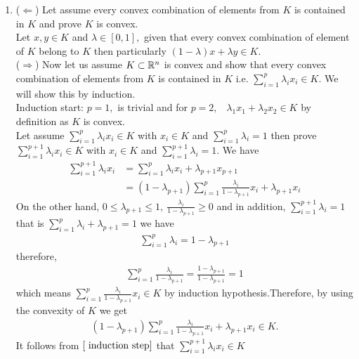 \documentclass{ExerciseSheet}
\begin{document}
\begin{solution}
\begin{enumerate}
    \item ($\Leftarrow$) Let assume every convex combination of elements from $K$ is contained in $K$ and prove $K$ is convex.\\
    Let $x,y\in K$ and $\lambda\in [0, 1],$ given that every convex combination of element of $K$ belong to $K$ then particularly $(1-\lambda)x+\lambda y\in K.$\\
    ($\Rightarrow$) Now let us assume $K\subset \mathbb{R}^n$ is convex and show that every convex combination of elements from $K$ is contained in $K$ i.e. $\displaystyle \sum_{i=1}^{p}\lambda_ix_i\in K.$ We will show this by induction.\\
    Induction start:  $p=1,$ is trivial and for $p=2,$~ $\lambda_1x_1+\lambda_2x_2\in K$ by definition as $K$ is convex.\\
    Let assume $\displaystyle \sum_{i=1}^{p}\lambda_ix_i\in K$ with $x_i\in K$ and $\displaystyle \sum_{i=1}^{p}\lambda_i=1$ then prove $\displaystyle \sum_{i=1}^{p+1}\lambda_ix_i\in K$ with $x_i\in K$ and $\displaystyle \sum_{i=1}^{p+1}\lambda_i=1.$
    We have
      \begin{align}
          \sum_{i=1}^{p+1}\lambda_ix_i&= \sum_{i=1}^{p}\lambda_ix_i+\lambda_{p+1}x_{p+1}\nonumber\\
                           &=(1-\lambda_{p+1})\sum_{i=1}^{p}\frac{\lambda_i}{1-\lambda_{p+1}}x_i+\lambda_{p+1}x_i \label{ induction step}
      \end{align}
    On the other hand, $0\leq \lambda_{p+1}\leq 1,~\frac{\lambda_i}{1-\lambda_{p+1}}\geq0$ and in addition, $\displaystyle \sum_{i=1}^{p+1}\lambda_i=1$ that is $\displaystyle \sum_{i=1}^{p}\lambda_i+ \lambda_{p+1}=1$ we have
    \begin{align*}
        \sum_{i=1}^{p}\lambda_i=1-\lambda_{p+1}
    \end{align*}
   therefore,
   \begin{align*}
        \sum_{i=1}^{p}\frac{\lambda_i}{1-\lambda_{p+1}}=\frac{1-\lambda_{p+1}}{1-\lambda_{p+1}}=1
    \end{align*}
 which means $\displaystyle \sum_{i=1}^{p}\frac{\lambda_i}{1-\lambda_{p+1}}x_i\in K$ by induction hypothesis.Therefore, by using the convexity of $K$ we get 
  \begin{align*}
      (1-\lambda_{p+1})\sum_{i=1}^{p}\frac{\lambda_i}{1-\lambda_{p+1}}x_i+\lambda_{p+1}x_i\in K.
  \end{align*}
 It follows from $\eqref{ induction step}$ that $\displaystyle \sum_{i=1}^{p+1}\lambda_ix_i\in K$
 





\end{enumerate}
\end{solution}
\end{document}
